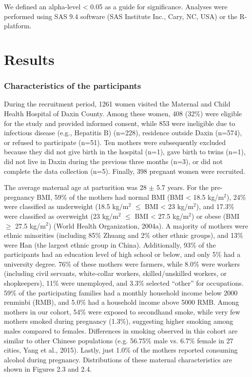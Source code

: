 We defined an alpha-level < 0.05 as a guide for significance. Analyses were performed using SAS 9.4 software (SAS Institute Inc., Cary, NC, USA) or the R-platform.

\section{Results}

\subsubsection{Characteristics of the participants}

During the recruitment period, 1261 women visited the Maternal and Child Health Hospital of Daxin County. Among these women, 408 (32\%) were eligible for the study and provided informed consent, while 853 were ineligible due to infectious disease (e.g., Hepatitis B) (n=228), residence outside Daxin (n=574), or refused to participate (n=51). Ten mothers were subsequently excluded because they did not give birth in the hospital (n=1), gave birth to twins (n=1), did not live in Daxin during the previous three months (n=3), or did not complete the data collection (n=5). Finally, 398 pregnant women were recruited. 

The average maternal age at parturition was 28 \({\pm}\) 5.7 years. For the pre-pregnancy BMI, 59\% of the mothers had normal BMI (BMI < 18.5 kg/\(\text{m}^{2}\)), 24\% were classified as underweight (18.5 kg/\(\text{m}^{2}\) ${\le}$ BMI < 23 kg/\(\text{m}^{2}\)), and 17.3\% were classified as overweight (23 kg/\(\text{m}^{2}\) ${\le}$  BMI < 27.5 kg/\(\text{m}^{2}\)) or obese (BMI ${\ge}$ 27.5 kg/\(\text{m}^{2}\)) (World Health Organization, 2004a). A majority of mothers were ethnic minorities (including 85\% Zhuang and 2\% other ethnic groups), and 13\% were Han (the largest ethnic group in China). Additionally, 93\% of the participants had an education level of high school or below, and only 5\% had a university degree. 76\% of these mothers were farmers, while 8.0\% were workers (including civil servants, white-collar workers, skilled/unskilled workers, or shopkeepers), 11\% were unemployed, and 3.3\% selected ``other'' for occupations. 59\% of the participating families had a monthly household income below 2000 renminbi (RMB), and 5.0\% had a household income above 5000 RMB. Among mothers in our cohort, 54\% were exposed to secondhand smoke, while very few mothers smoked during pregnancy (1.3\%), suggesting higher smoking among males compared to females. Differences in smoking observed in this cohort are similar to other Chinese populations (e.g. 56.75\% male vs. 6.7\% female in 27 cities, Yang et al., 2015). Lastly, just 1.0\% of the mothers reported consuming alcohol during pregnancy. Distributions of these maternal characteristics are shown in Figures 2.3 and 2.4.

